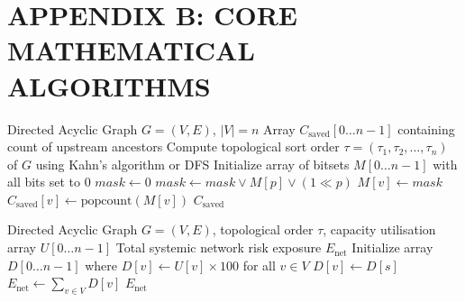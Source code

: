 \chapter*{APPENDIX B: CORE MATHEMATICAL ALGORITHMS}

\begin{algorithm}[h!]
\caption{Bitset Ancestor Reachability over Topological Order}
\label{alg:bitset_reachability}
\begin{algorithmic}[1]
\REQUIRE Directed Acyclic Graph $G = (V, E)$, $|V| = n$
\ENSURE Array $C_{\text{saved}}[0 \dots n-1]$ containing count of upstream ancestors
\STATE Compute topological sort order $\tau = (\tau_1, \tau_2, \dots, \tau_n)$ of $G$ using Kahn's algorithm or DFS
\STATE Initialize array of bitsets $M[0 \dots n-1]$ with all bits set to 0
    \STATE $mask \leftarrow 0$
        \STATE $mask \leftarrow mask \lor M[p] \lor (1 \ll p)$ 
    \ENDFOR
    \STATE $M[v] \leftarrow mask$
    \STATE $C_{\text{saved}}[v] \leftarrow \text{popcount}(M[v])$ 
\ENDFOR
\RETURN $C_{\text{saved}}$
\end{algorithmic}
\end{algorithm}

\begin{algorithm}[h!]
\caption{Dynamic Programming for Systemic Network Risk Exposure}
\label{alg:network_exposure}
\begin{algorithmic}[1]
\REQUIRE Directed Acyclic Graph $G = (V, E)$, topological order $\tau$, capacity utilisation array $U[0 \dots n-1]$
\ENSURE Total systemic network risk exposure $E_{\text{net}}$
\STATE Initialize array $D[0 \dots n-1]$ where $D[v] \leftarrow U[v] \times 100$ for all $v \in V$
 
            \STATE $D[v] \leftarrow D[s]$
        \ENDIF
    \ENDFOR
\ENDFOR
\STATE $E_{\text{net}} \leftarrow \sum_{v \in V} D[v]$
\RETURN $E_{\text{net}}$
\end{algorithmic}
\end{algorithm}

